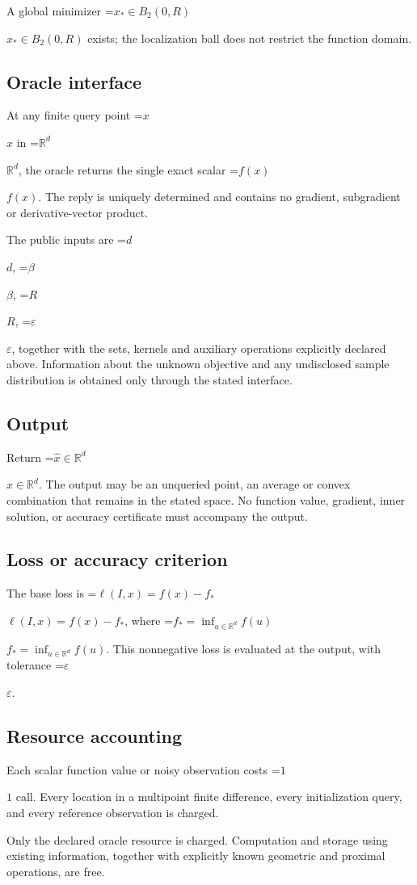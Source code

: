 \documentclass[10pt,a4paper]{article}
\newcommand{\AtlasMath}[1]{\par\begingroup\centering\setbox0=\hbox{$\displaystyle #1$}\ifdim\wd0>1.4\linewidth\typeout{ATLAS WIDE FORMULA: \the\wd0}\fi\ifdim\wd0>\linewidth\resizebox{\linewidth}{!}{\box0}\else\box0\fi\par\endgroup}
\newcommand{\AtlasInlineMath}[1]{\begingroup\setbox0=\hbox{$#1$}\ifdim\wd0>.4\linewidth\endgroup\AtlasMath{#1}\else\endgroup$#1$\fi}
\begin{document}
A global minimizer \AtlasInlineMath{x_*\in B_2(0,R)} exists; the localization ball does not restrict the function domain.

\subsection{Oracle interface}
At any finite query point \AtlasInlineMath{x} in \AtlasInlineMath{\mathbb{R}^d}, the oracle returns the single exact scalar \AtlasInlineMath{f(x)}. The reply is uniquely determined and contains no gradient, subgradient or derivative-vector product.

The public inputs are \AtlasInlineMath{d}, \AtlasInlineMath{\beta}, \AtlasInlineMath{R}, \AtlasInlineMath{\varepsilon}, together with the sets, kernels and auxiliary operations explicitly declared above. Information about the unknown objective and any undisclosed sample distribution is obtained only through the stated interface.

\subsection{Output}
Return \AtlasInlineMath{\widehat{x}\in \mathbb{R}^d}. The output may be an unqueried point, an average or convex combination that remains in the stated space. No function value, gradient, inner solution, or accuracy certificate must accompany the output.

\subsection{Loss or accuracy criterion}
The base loss is \AtlasInlineMath{\ell(I,x)=f(x)-f_*}, where \AtlasInlineMath{f_*=\inf_{u\in \mathbb{R}^d}f(u)}. This nonnegative loss is evaluated at the output, with tolerance \AtlasInlineMath{\varepsilon}.

\subsection{Resource accounting}
Each scalar function value or noisy observation costs \AtlasInlineMath{1} call. Every location in a multipoint finite difference, every initialization query, and every reference observation is charged.

Only the declared oracle resource is charged. Computation and storage using existing information, together with explicitly known geometric and proximal operations, are free.
\end{document}
